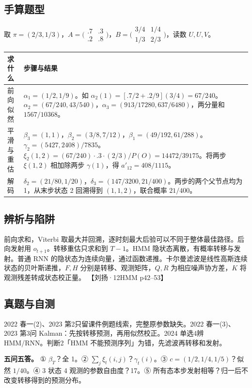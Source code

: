 \documentclass[UTF8,a4paper,zihao=-4,fontset=fandol]{ctexart}
\begin{document}
\subsection{手算题型}
取 $\pi=(2/3,1/3)$，$A=\bigl(\begin{smallmatrix}.7&.3\\.2&.8\end{smallmatrix}\bigr)$，$B=\bigl(\begin{smallmatrix}3/4&1/4\\1/3&2/3\end{smallmatrix}\bigr)$，读数 $U,U,V$。

\begin{tabularx}{\linewidth}{@{}p{.16\linewidth}X@{}}
\toprule
求什么 & 步骤与结果\\
\midrule
前向似然 & $\alpha_1=(1/2,1/9)$。如 $\alpha_2(1)=[.7/2+.2/9](3/4)=67/240$。$\alpha_2=(67/240,43/540)$，$\alpha_3=(913/17280,637/6480)$，两分量和 $1567/10368$。\\
平滑与重估 & $\beta_3=(1,1)$，$\beta_2=(3/8,7/12)$，$\beta_1=(49/192,61/288)$。$\gamma_2=(5427,2408)/7835$。$\xi_2(1,2)=(67/240)\cdot.3\cdot(2/3)/P(O)=14472/39175$。将两步 $\xi(1,2)$ 相加除两步 $\gamma(1)$，得 $a'_{12}=408/1115$。\\
解码 & $\delta_2=(21/80,1/20)$，$\delta_3=(147/3200,21/400)$。两步的两个父节点均为 1，从末步状态 2 回溯得到 $(1,1,2)$，联合概率 $21/400$。\\
\bottomrule
\end{tabularx}

\subsection{辨析与陷阱}
前向求和，Viterbi 取最大并回溯，逐时刻最大后验可以不同于整体最佳路径。后向发射用 $o_{t+1}$。转移重估只求和到 $T-1$。HMM 隐状态离散，有概率转移与发射。普通 RNN 的隐状态为连续向量，通过函数递推。卡尔曼滤波是线性高斯连续状态的贝叶斯递推，$F,H$ 分别是转移、观测矩阵，$Q,R$ 为相应噪声协方差，$K$ 将观测残差转成状态校正量。 【刘扬·12HMM p42–53】

\subsection{真题与自测}
2022 春一(2)、2023 第2只留课件例题线索，完整原参数缺失。2022 春一(3)、2023 第3问 Kalman：先按转移预测，再用似然校正。2024 单选4辨 HMM/RNN。判断2「HMM 不能预测序列」为错，先滤波再转移和发射。

\textbf{五问五答。} ① $\beta_T$？全 1。② $\sum_j\xi_t(i,j)$？$\gamma_t(i)$。③ $c=(1/2,1/4,1/5)$？似然 $1/40$。④ 3 状态 4 观测的参数自由度？17。⑤ 所有态本步发射相等？归一后不改变转移得到的预测分布。
\end{document}

